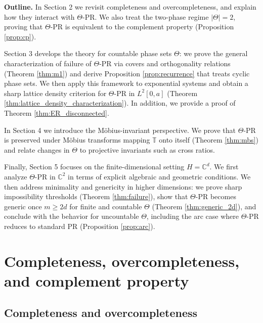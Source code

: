 \documentclass[reqno,a4paper,11pt]{amsart}
\numberwithin{equation}{section}
\def\T{{\mathbb T}}
\def\C{{\mathbb C}}
\newcommand\1{\mathds{1}}
\begin{document}
\textbf{Outline.}
In Section 2 we revisit completeness and overcompleteness, and explain how they interact with $\Theta$-PR. We also treat the two-phase regime $|\Theta|=2$, proving that $\Theta$-PR is equivalent to the complement property (Proposition \ref{prop:cp}).

Section 3 develops the theory for countable phase sets $\Theta$: we prove the general characterization of failure of $\Theta$-PR via covers and orthogonality relations (Theorem \ref{thm:m1}) and derive Proposition \ref{prop:recurrence} that treats cyclic phase sets. We then apply this framework to exponential systems and obtain a sharp lattice density criterion for $\Theta$-PR in $L^2[0,a]$ (Theorem \ref{thm:lattice_density_characterization}). In addition, we provide a proof of Theorem \ref{thm:ER_disconnected}.

In Section 4 we introduce the Möbius-invariant perspective. We prove that $\Theta$-PR is preserved under Möbius transforms mapping $\T$ onto itself (Theorem \ref{thm:mbs}) and relate changes in $\Theta$ to projective invariants such as cross ratios.

Finally, Section 5 focuses on the finite-dimensional setting $H=\C^d$. We first analyze $\Theta$-PR in $\C^2$ in terms of explicit algebraic and geometric conditions. We then address minimality and genericity in higher dimensions: we prove sharp impossibility thresholds (Theorem \ref{thm:failure}), show that $\Theta$-PR becomes generic once $m \geq 2d$ for finite and countable $\Theta$ (Theorem \ref{thm:generic_2d}), and conclude with the behavior for uncountable $\Theta$, including the arc case where $\Theta$-PR reduces to standard PR (Proposition \ref{prop:arc}).


\section{Completeness, overcompleteness, and complement property}\label{sec:2}

\subsection{Completeness and overcompleteness}\label{sec:completness_and_overcompleteness}
\end{document}
